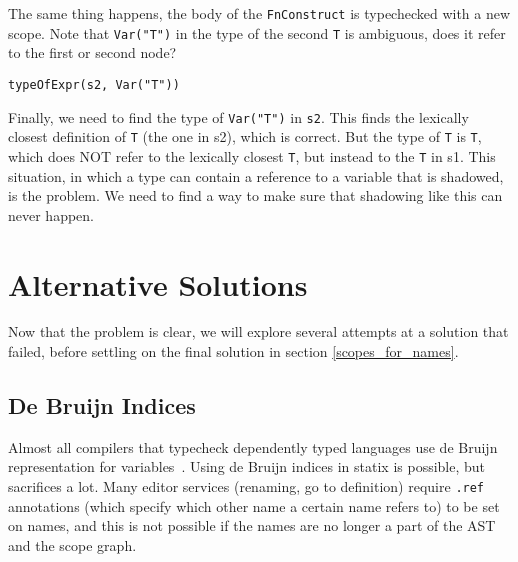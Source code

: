 \noindent
The same thing happens, the body of the \verb|FnConstruct| is typechecked with a new scope. Note that \verb|Var("T")| in the type of the second \verb|T| is ambiguous, does it refer to the first or second node?

\begin{lstlisting}
typeOfExpr(s2, Var("T"))
\end{lstlisting}

Finally, we need to find the type of \verb|Var("T")| in \verb|s2|. This finds the lexically closest definition of \verb|T| (the one in s2), which is correct. But the type of \verb|T| is \verb|T|, which does NOT refer to the lexically closest \verb|T|, but instead to the \verb|T| in s1. This situation, in which a type can contain a reference to a variable that is shadowed, is the problem. We need to find a way to make sure that shadowing like this can never happen.

\section{Alternative Solutions}

Now that the problem is clear, we will explore several attempts at a solution that failed, before settling on the final solution in section \ref{scopes_for_names}.

\subsection{De Bruijn Indices}

Almost all compilers that typecheck dependently typed languages use de Bruijn representation for variables~\cite{lean}. Using de Bruijn indices in statix is possible, but sacrifices a lot. Many editor services (renaming, go to definition) require \verb|.ref| annotations (which specify which other name a certain name refers to) to be set on names, and this is not possible if the names are no longer a part of the AST and the scope graph.

